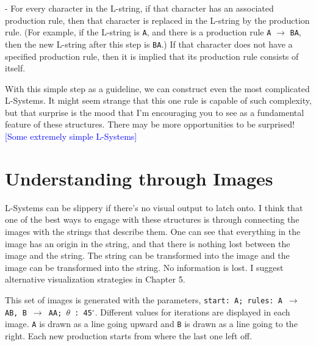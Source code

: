 \documentclass[12pt,twoside]{reedthesis}
\newcommand{\code}[1]{\texttt{#1}}
\begin{document}
	\begin{addmargin}[4em]{4em}
	- For every character in the L-string, if that character has an associated production rule, then that character is replaced in the L-string by the production rule. (For example, if the L-string is \code{A}, and there is a production rule \code{A} $\rightarrow$ \code{BA}, then the new L-string after this step is \code{BA}.) If that character does not have a specified production rule, then it is implied that its production rule consists of itself.\\
	 \end{addmargin}
	 
	 With this simple step as a guideline, we can construct even the most complicated L-Systems. It might seem strange that this one rule is capable of such complexity, but that surprise is the mood that I'm encouraging you to see as a fundamental feature of these structures. There may be more opportunities to be surprised!\\

	\textcolor{blue}{[Some extremely simple L-Systems]}

\section{Understanding through Images}
\label{Understanding-through-Images}

	L-Systems can be slippery if there's no visual output to latch onto. I think that one of the best ways to engage with these structures is through connecting the images with the strings that describe them. One can see that everything in the image has an origin in the string, and that there is nothing lost between the image and the string. The string can be transformed into the image and the image can be transformed into the string. No information is lost. I suggest alternative visualization strategies in Chapter 5.

This set of images is generated with the parameters, \code{start: A; rules: A $\rightarrow$ AB, B $\rightarrow$ AA; $\theta$ : 45$^{\circ}$}. Different values for iterations are displayed in each image. \code{A} is drawn as a line going upward and \code{B} is drawn as a line going to the right. Each new production starts from where the last one left off.\\
\end{document}
